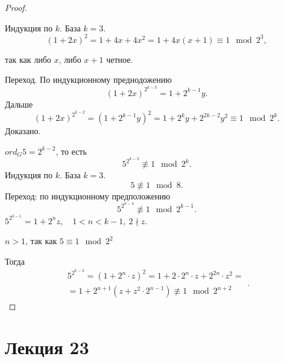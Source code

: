 \documentclass[12pt]{report}
\begin{document}
\begin{proof}
\begin{enumerate}
	    Индукция по $k$. 
	    База $k=3$. \[
		(1 + 2x)^2 = 1 + 4x + 4x^2 = 1 + 4x(x+1) \equiv 1 \mod 2^{3}
	    ,\] 
	    
    \end{enumerate}
так как либо $x$, либо $x+1$ четное.

Переход. По индукционному преднодожению \[
    (1 + 2x)^{2^{k-3}} = 1 + 2^{k-1}y
.\] 
Дальше
\[
    (1+2x)^{2^{k-2}}= (1+2^{k-1}y)^2 = 1 + 2^k y + 2^{2k-2}y^2 \equiv 1 \mod 2^{k}
.\] 
Доказано.

\item $ord_G 5 = 2^{k-2}$, то есть   \[
5^{2^{k-3}}\not\equiv 1 \mod 2^k
.\] 
Индукция по $k$. База $k = 3$. \[
5 \not\equiv 1\mod 8
.\] 
Переход: по индукционному предположению \[
5^{2^{k-4}}\not\equiv 1 \mod 2^{k-1}
.\] 
$5^{2^{k-1}} = 1 + 2^{n}z, \quad 1 < n < k-1, ~ 2 \nmid z$. 
\begin{rem}
    $n > 1$, так как $5 \equiv 1 \mod 2^{2}$
\end{rem}
Тогда
\[
    \begin{array}{c}
    5^{2^{k-3}} = (1 + 2^{n} \cdot z ) ^2 = 1 + 2\cdot 2^n \cdot z + 2^{2n}\cdot z^{2} = \\
    = 1 + 2^{n+1} ( z + z^2 \cdot 2^{n-1}) \not\equiv 1 \mod 2^{n+2} 
    \end{array}
.\] 
\end{proof}
\section{Лекция 23}
\end{document}
